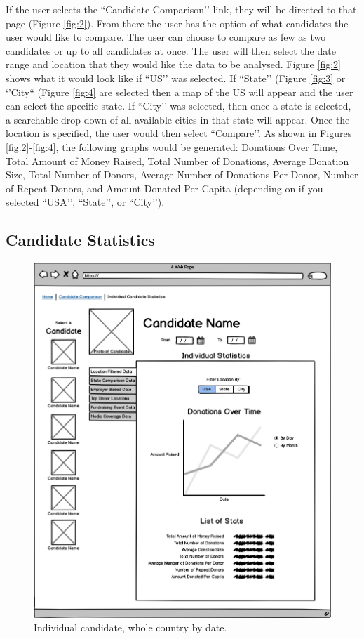 \documentclass[12pt]{article}
\begin{document}
    If the user selects the ``Candidate Comparison’’ link, they will be directed to that page (Figure \ref{fig:2}). From there the user has the option of what candidates the user would like to compare. The user can choose to compare as few as two candidates or up to all candidates at once. The user will then select the date range and location that they would like the data to be analysed. Figure \ref{fig:2} shows what it would look like if ``US’’ was selected. If ``State’’ (Figure \ref{fig:3} or ‘’City`` (Figure \ref{fig:4} are selected then a map of the US will appear and the user can select the specific state. If ``City’’ was selected, then once a state is selected, a searchable drop down of all available cities in that state will appear. Once the location is specified, the user would then select ``Compare’’. As shown in Figures \ref{fig:2}-\ref{fig:4}, the following graphs would be generated: Donations Over Time, Total Amount of Money Raised, Total Number of Donations, Average Donation Size, Total Number of Donors, Average Number of Donations Per Donor, Number of Repeat Donors, and Amount Donated Per Capita (depending on if you selected ``USA’’, ``State’’, or ``City’’).

    \subsection{Candidate Statistics}
    \begin{figure}[H]
        \begin{center}
        \includegraphics[scale=.30]{candidatefilterusday}
        \caption{Individual candidate, whole country by date.}
        \label{fig:5}
        \end{center}
    \end{figure}
    
\end{document}
